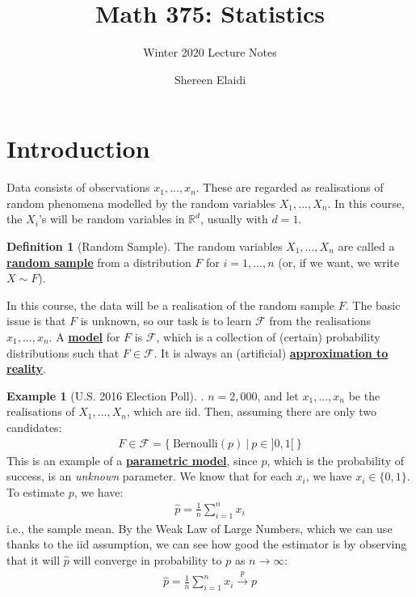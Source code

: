\documentclass[11pt]{scrartcl}
\title{\textbf{Math 375: Statistics} \vspace{-2ex}}
\author{Winter 2020 Lecture Notes \vspace{-2ex}}
\date{Shereen Elaidi}
\newcommand{\R}[0]{\mathbb{R}}
\theoremstyle{definition}
\newtheorem{definition}{Definition}
\newtheorem{ex}{Example}
\theoremstyle{remark}
\newcommand{\dfn}[1]{\textbf{\underline{#1}}}
\newcommand{\dist}[0]{\mathcal{F}}
\newcommand{\cvp}[0]{\overset{p}{\to}}
\begin{document}
\maketitle
\tableofcontents



\pagestyle{fancy}
\lfoot{}
\cfoot{}
\rfoot{}
\renewcommand{\headrulewidth}{0.4pt}
\renewcommand{\footrulewidth}{0.4pt}
\setlength{\tabcolsep}{0.5em} %
{\renewcommand{\arraystretch}{1.2}%

\section{Introduction}
Data consists of observations $x_1, ..., x_n$. These are regarded as realisations of random phenomena modelled by the random variables $X_1, ... , X_n$. In this course, the $X_i$'s will be random variables in $\R^d$, usually with $d=1$. 

\begin{definition}[Random Sample]
	The random variables $X_1, ..., X_n$ are called a \dfn{random sample} from a distribution $F$ for $i=1,...,n$ (or, if we want, we write $X \sim F$). 
\end{definition}

In this course, the data will be a realisation of the random sample $F$. The basic issue is that $F$ is unknown, so our task is to learn $\dist$ from the realisations $x_1, ..., x_n$. A \dfn{model} for $F$ is $\dist$, which is a collection of (certain) probability distributions such that $F \in \dist$. It is always an (artificial)  \dfn{approximation to reality}. 

\begin{ex}[U.S. 2016 Election Poll]. $n=2,000$, and let $x_1, ..., x_n$ be the realisations of $X_1, ..., X_n$, which are iid. Then, assuming there are only two candidates: 
\begin{align*}
	F \in \dist = \{\ \text{Bernoulli}(p)\ |\ p \in ]0,1[\ \} 	
\end{align*}
	This is an example of a \dfn{parametric model}, since $p$, which is the probability of success, is an \emph{unknown} parameter. We know that for each $x_i$, we have $x_i \in \{ 0, 1 \}$. To estimate $p$, we have:
	\begin{align*}
		\hat{p} = \frac{1}{n}	\sum_{i=1}^n x_i 
	\end{align*}
	i.e., the sample mean. By the Weak Law of Large Numbers, which we can use thanks to the iid assumption, we can see how good the estimator is by observing that it will $\hat{p}$ will converge in probability to $p$ as $n \rightarrow \infty$: 
	\begin{align}
		\hat{p} = \frac{1}{n} \sum_{i=1}^{n} x_i \cvp p 
	\end{align}
\end{ex}

}
\end{document}
